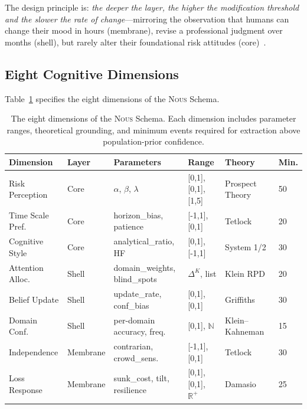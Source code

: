 \documentclass[11pt]{article}
\newcommand{\nous}{\textsc{Nous}}
\begin{document}
The design principle is: \emph{the deeper the layer, the higher the modification threshold and the slower the rate of change}---mirroring the observation that humans can change their mood in hours (membrane), revise a professional judgment over months (shell), but rarely alter their foundational risk attitudes (core)~\citep{tversky1992advances}.

\subsection{Eight Cognitive Dimensions}

Table~\ref{tab:dimensions} specifies the eight dimensions of the \nous{} Schema.

\begin{table}[t]
\centering
\caption{The eight dimensions of the \nous{} Schema. Each dimension includes parameter ranges, theoretical grounding, and minimum events required for extraction above population-prior confidence.}
\label{tab:dimensions}
\small
\begin{tabular}{@{}llllll@{}}
\toprule
\textbf{Dimension} & \textbf{Layer} & \textbf{Parameters} & \textbf{Range} & \textbf{Theory} & \textbf{Min.} \\
\midrule
Risk Perception & Core & $\alpha$, $\beta$, $\lambda$ & [0,1], [0,1], [1,5] & Prospect Theory~\citep{kahneman1979prospect} & 50 \\
Time Scale Pref. & Core & horizon\_bias, patience & [-1,1], [0,1] & Tetlock~\citep{tetlock2015superforecasting} & 20 \\
Cognitive Style & Core & analytical\_ratio, HF & [0,1], [-1,1] & System 1/2~\citep{kahneman2011thinking} & 30 \\
\midrule
Attention Alloc. & Shell & domain\_weights, blind\_spots & $\Delta^K$, list & Klein RPD~\citep{klein1998sources} & 20 \\
Belief Update & Shell & update\_rate, conf\_bias & [0,1], [0,1] & Griffiths~\citep{griffiths2008bayesian} & 30 \\
Domain Conf. & Shell & per-domain accuracy, freq. & [0,1], $\mathbb{N}$ & Klein--Kahneman~\citep{kahneman2009conditions} & 15 \\
\midrule
Independence & Membrane & contrarian, crowd\_sens. & [-1,1], [0,1] & Tetlock~\citep{tetlock2005expert} & 30 \\
Loss Response & Membrane & sunk\_cost, tilt, resilience & [0,1], [0,1], $\mathbb{R}^+$ & Damasio~\citep{damasio1994descartes} & 25 \\
\bottomrule
\end{tabular}
\end{table}
\end{document}
